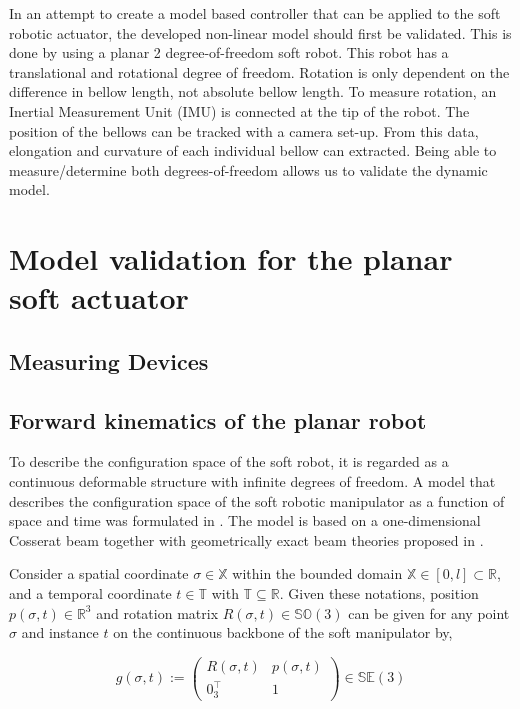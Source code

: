In an attempt to create a model based controller that can be applied to the soft robotic actuator, the developed non-linear model should first be validated. This is done by using a planar 2 degree-of-freedom soft robot. This robot has a translational and rotational degree of freedom. Rotation is only dependent on the difference in bellow length, not absolute bellow length. To measure rotation, an Inertial Measurement Unit (IMU) is connected at the tip of the robot. The position of the bellows can be tracked with a camera set-up. From this data, elongation and curvature of each individual bellow can extracted. Being able to measure/determine both degrees-of-freedom allows us to validate the dynamic model. 

\section{Model validation for the planar soft actuator}


\subsection{Measuring Devices}




\subsection{Forward kinematics of the planar robot}

To describe the configuration space of the soft robot, it is regarded as a continuous deformable structure with infinite degrees of freedom.
A model that describes the configuration space of the soft robotic manipulator as a function of space and time was formulated in \cite{Caasenbrood2020}. The model is based on a one-dimensional Cosserat beam together with geometrically exact beam theories proposed in \cite{Simo1986}.

Consider a spatial coordinate $\sigma \in \mathbb{X}$ within the bounded domain $\mathbb{X} \in [0,l] \subset \mathbb{R}$, and a temporal coordinate $t \in  \mathbb{T}$ with $\mathbb{T} \subseteq \mathbb{R}$. Given these notations, position $p(\sigma,t) \in \mathbb{R}^3$ and rotation matrix $R(\sigma,t) \in \mathbb{SO}(3)$ can be given for any point $\sigma$ and instance $t$ on the continuous backbone of the soft manipulator by,

\begin{equation}
    g(\sigma,t) := \begin{pmatrix}  R(\sigma,t) & p(\sigma,t) \\ 0_3^\top & 1 \end{pmatrix} \in \mathbb{SE}(3)
    \label{eq2:g}
\end{equation}

